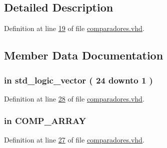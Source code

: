 \subsection{Detailed Description}


Definition at line \hyperlink{comparadores_8vhd_source_l00019}{19} of file \hyperlink{comparadores_8vhd_source}{comparadores.\+vhd}.



\subsection{Member Data Documentation}
\hypertarget{classcomparadores_a0d7d8d086cf18e0180f8c280d76ed624}{}
\subsubsection[{amost}]{ {\bfseries \textcolor{keywordflow}{in}\textcolor{vhdlchar}{ }} {\bfseries \textcolor{comment}{std\+\_\+logic\+\_\+vector}\textcolor{vhdlchar}{ }\textcolor{vhdlchar}{(}\textcolor{vhdlchar}{ }\textcolor{vhdlchar}{ } \textcolor{vhdldigit}{24} \textcolor{vhdlchar}{ }\textcolor{keywordflow}{downto}\textcolor{vhdlchar}{ }\textcolor{vhdlchar}{ } \textcolor{vhdldigit}{1} \textcolor{vhdlchar}{ }\textcolor{vhdlchar}{)}\textcolor{vhdlchar}{ }} \hspace{0.3cm}{\ttfamily [Port]}}\label{classcomparadores_a0d7d8d086cf18e0180f8c280d76ed624}


Definition at line \hyperlink{comparadores_8vhd_source_l00028}{28} of file \hyperlink{comparadores_8vhd_source}{comparadores.\+vhd}.

\hypertarget{classcomparadores_ab52608f377848fc687beeb76bb39a6e8}{}
\subsubsection[{c}]{ {\bfseries \textcolor{keywordflow}{in}\textcolor{vhdlchar}{ }} {\bfseries {\bfseries {\bf C\+O\+M\+P\+\_\+\+A\+R\+R\+A\+Y}} \textcolor{vhdlchar}{ }} \hspace{0.3cm}{\ttfamily [Port]}}\label{classcomparadores_ab52608f377848fc687beeb76bb39a6e8}


Definition at line \hyperlink{comparadores_8vhd_source_l00027}{27} of file \hyperlink{comparadores_8vhd_source}{comparadores.\+vhd}.

